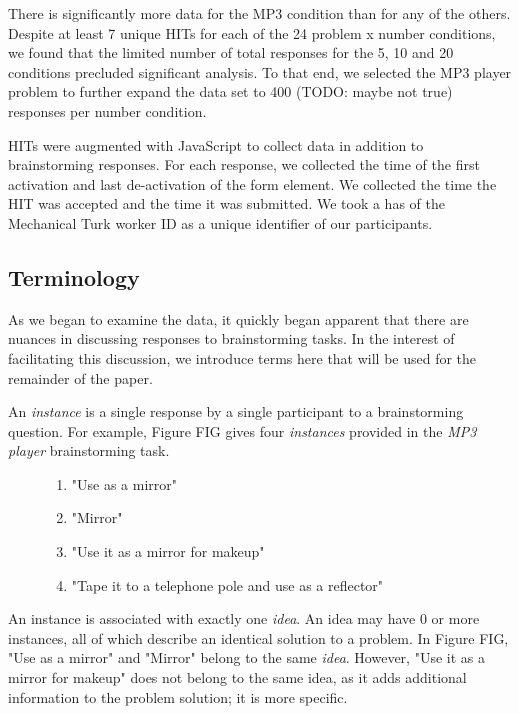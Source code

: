 There is significantly more data for the MP3 condition than for any of the others. Despite at least 7 unique HITs for each of the 24 problem x number conditions, we found that the limited number of total responses for the 5, 10 and 20 conditions precluded significant analysis. To that end, we selected the MP3 player problem to further expand the data set to 400 (TODO: maybe not true) responses per number condition.

HITs were augmented with JavaScript to collect data in addition to brainstorming responses. For each response, we collected the time of the first activation and last de-activation of the form element. We collected the time the HIT was accepted and the time it was submitted. We took a has of the Mechanical Turk worker ID as a unique identifier of our participants.

\subsection{Terminology}

As we began to examine the data, it quickly began apparent that there are nuances in discussing responses to brainstorming tasks. In the interest of facilitating this discussion, we introduce terms here that will be used for the remainder of the paper.

An \emph{instance} is a single response by a single participant to a brainstorming question. For example, Figure FIG gives four \emph{instances} provided in the \emph{MP3 player} brainstorming task.

\begin{figure}[!h]
    \begin{enumerate}
        \item "Use as a mirror"
        \item "Mirror"
        \item "Use it as a mirror for makeup"
        \item "Tape it to a telephone pole and use as a reflector"
    \end{enumerate}
\end{figure}

An instance is associated with exactly one \emph{idea}. An idea may have 0 or more instances, all of which describe an identical solution to a problem. In Figure FIG, "Use as a mirror" and "Mirror" belong to the same \emph{idea}. However, "Use it as a mirror for makeup" does not belong to the same idea, as it adds additional information to the problem solution; it is more specific.

